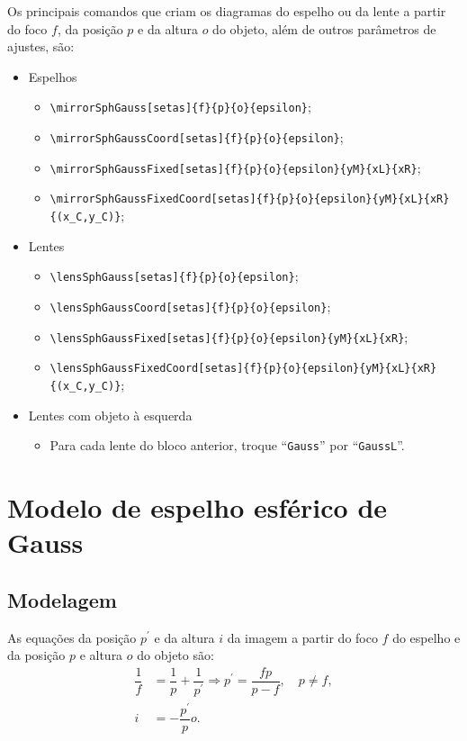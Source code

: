 \documentclass[a4paper,10pt]{article}
\begin{document}
Os principais comandos que criam os diagramas do espelho ou da lente a partir do foco $f$, da posição $p$ e da altura $o$ do objeto, além de outros parâmetros de ajustes, são:
\begin{itemize}
  \item Espelhos
  \begin{itemize}
    \item \verb|\mirrorSphGauss[setas]{f}{p}{o}{epsilon}|;
    \item \verb|\mirrorSphGaussCoord[setas]{f}{p}{o}{epsilon}|;
    \item \verb|\mirrorSphGaussFixed[setas]{f}{p}{o}{epsilon}{yM}{xL}{xR}|;
    \item \verb|\mirrorSphGaussFixedCoord[setas]{f}{p}{o}{epsilon}{yM}{xL}{xR}{(x_C,y_C)}|;
  \end{itemize}
  \item Lentes
  \begin{itemize}
    \item \verb|\lensSphGauss[setas]{f}{p}{o}{epsilon}|;
    \item \verb|\lensSphGaussCoord[setas]{f}{p}{o}{epsilon}|;
    \item \verb|\lensSphGaussFixed[setas]{f}{p}{o}{epsilon}{yM}{xL}{xR}|;
    \item \verb|\lensSphGaussFixedCoord[setas]{f}{p}{o}{epsilon}{yM}{xL}{xR}{(x_C,y_C)}|;
  \end{itemize}
  \item Lentes com objeto à esquerda
  \begin{itemize}
    \item Para cada lente do bloco anterior, troque \enquote{\texttt{Gauss}} por \enquote{\texttt{GaussL}}.
  \end{itemize}
\end{itemize}

\section{Modelo de espelho esférico de Gauss}

\subsection{Modelagem}

As equações da posição $p^{\prime}$ e da altura $i$ da imagem a partir do foco $f$ do espelho e da posição $p$ e altura $o$ do objeto são:
\begin{equation}
  \begin{split}
    \dfrac{1}{f} & = \dfrac{1}{p} + \dfrac{1}{p^{\prime}} \Rightarrow p^{\prime} = \dfrac{f p}{p - f}, \quad p \neq f, \\
    i            & = - \dfrac{p^{\prime}}{p} o.
  \end{split}
\end{equation}
\end{document}
